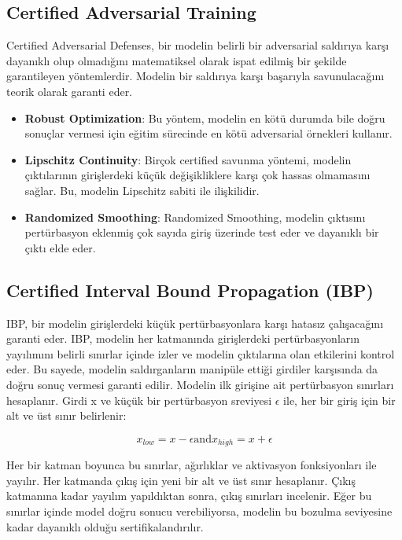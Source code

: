 \newpage

\subsection{Certified Adversarial Training}

Certified Adversarial Defenses, bir modelin belirli bir adversarial saldırıya karşı dayanıklı olup olmadığını matematiksel olarak ispat edilmiş bir şekilde garantileyen yöntemlerdir. Modelin bir saldırıya karşı başarıyla savunulacağını teorik olarak garanti eder. 

\begin{itemize}
    \item \textbf{Robust Optimization}: Bu yöntem, modelin en kötü durumda bile doğru sonuçlar vermesi için eğitim sürecinde en kötü adversarial örnekleri kullanır.
    \item \textbf{Lipschitz Continuity}: Birçok certified savunma yöntemi, modelin çıktılarının girişlerdeki küçük değişikliklere karşı çok hassas olmamasını sağlar. Bu, modelin Lipschitz sabiti ile ilişkilidir.
    \item \textbf{Randomized Smoothing}: Randomized Smoothing, modelin çıktısını pertürbasyon eklenmiş çok sayıda giriş üzerinde test eder ve dayanıklı bir çıktı elde eder.
\end{itemize}

\subsection{Certified Interval Bound Propagation (IBP)}

IBP, bir modelin girişlerdeki küçük pertürbasyonlara karşı hatasız çalışacağını garanti eder. IBP, modelin her katmanında girişlerdeki pertürbasyonların yayılımını belirli sınırlar içinde izler ve modelin çıktılarına olan etkilerini kontrol eder. Bu sayede, modelin saldırganların manipüle ettiği girdiler karşısında da doğru sonuç vermesi garanti edilir. Modelin ilk girişine ait pertürbasyon sınırları hesaplanır. Girdi x ve küçük bir pertürbasyon sreviyesi $\epsilon$ ile, her bir giriş için bir alt ve üst sınır belirlenir:

\[ x_{low} = x - \epsilon \text{and} x_{high} = x + \epsilon \]

Her bir katman boyunca bu sınırlar, ağırlıklar ve aktivasyon fonksiyonları ile yayılır. Her katmanda çıkış için yeni bir alt ve üst sınır hesaplanır. Çıkış katmanına kadar yayılım yapıldıktan sonra, çıkış sınırları incelenir. Eğer bu sınırlar içinde model doğru sonucu verebiliyorsa, modelin bu bozulma seviyesine kadar dayanıklı olduğu sertifikalandırılır.

